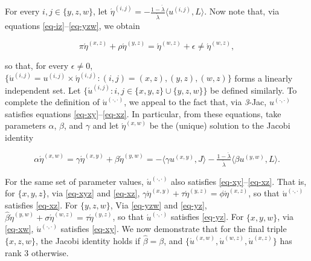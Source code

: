 \documentclass[12pt,a4paper,twoside]{article}
\renewcommand{\ij}{{(i, j)}}
\newcommand{\xy}{{(x, y)}}
\newcommand{\yz}{{(y,z)}}
\newcommand{\xz}{{(x,z)}}
\newcommand{\xw}{{(x,w)}}
\newcommand{\yw}{{(y,w)}}
\newcommand{\wz}{(w,z)}
\newcommand{\dd}{{(\cdot,\cdot)}}
\newcommand{\threejac}{\textup{\textit{3}-Jac}}
\begin{document}
\begin{appendices}
For every $i,j \in \{y,z,w\}$, let
$\acute{\eta}^{\ij} = - \frac{1 - \acute{\lambda}}{\acute{\lambda}} \langle
u^{\ij}, L \rangle $.  Now note that, via equations
\eqref{eq-iz}--\eqref{eq-yzw}, we obtain
\begin{linenomath*}
  \begin{equation}\label{eq-3d-epsilon}
    \pi  \acute{\eta}^{\xz} + \rho  \acute{\eta}^{\yz} = \acute{\eta}^{\wz} + \epsilon \neq
    \acute{\eta}^{\wz},
  \end{equation}
\end{linenomath*}
so that, for every $\epsilon\neq 0$,
$\{\acute{u}^{\ij} = u^{\ij} \times \acute{\eta}^{\ij}: \ij = \xz, \yz, \wz\}$
forms a linearly independent set. Let
$\{\acute{u}^{\ij}: i,j \in \{x,y,z\}\cup \{y,z,w\}\}$ be defined similarly. To
complete the definition of $\acute{u}^{\dd}$, we appeal to the fact that, via
\threejac, $u^{\dd}$ satisfies equations \eqref{eq-xy}--\eqref{eq-xz}. In
particular, from these equations, take parameters $\alpha$, $\beta$, and $\gamma$
and let $\acute{\eta}^{\xw}$ be the (unique) solution to the Jacobi identity
\begin{linenomath*}
  \begin{equation}\label{eq-xw}
    \alpha  \acute{\eta}^{\xw} =  \gamma  \acute{\eta}^{\xy} + \beta \acute{\eta}^{\yw} =
    -\langle \gamma  u^{\xy} , J \rangle -
    \tfrac{1-\acute{\lambda}}{\acute{\lambda}}\langle\beta u^{\yw}, L  \rangle.
  \end{equation}
\end{linenomath*}
For the same set of parameter values, $\acute{u}^{\dd}$ also satisfies
\eqref{eq-xy}--\eqref{eq-xz}. That is, for $\{x,y,z\}$, via \cref{eq-xyz} and \eqref{eq-xz},
$\gamma \acute{\eta}^{\xy}+\tau \acute{\eta}^{\yz} = \phi \acute{\eta}^{\xz}$,
so that $\acute{u}^{\dd}$ satisfies \eqref{eq-xz}. For $\{y,z,w\}$, Via \cref{eq-yzw} and
\eqref{eq-yz},
$\hat{\beta} \acute{\eta}^{\yw}+\sigma \acute{\eta}^{\wz} = \tau
\acute{\eta}^{\yz}$, so that $\acute{u}^{\dd}$ satisfies \eqref{eq-yz}. For $\{x,y,w\}$,
via \cref{eq-xw}, $\acute{u}^{\dd}$ satisfies \eqref{eq-xy}.  We now demonstrate
that for the final triple $\{x,z,w\}$,  the Jacobi identity holds if
$\hat{\beta} = \beta$, and  $\{\acute{u}^{\xw},\acute{u}^{\wz},\acute{u}^{\xz}\}$
has rank $3$ otherwise.


\end{appendices}
\end{document}
